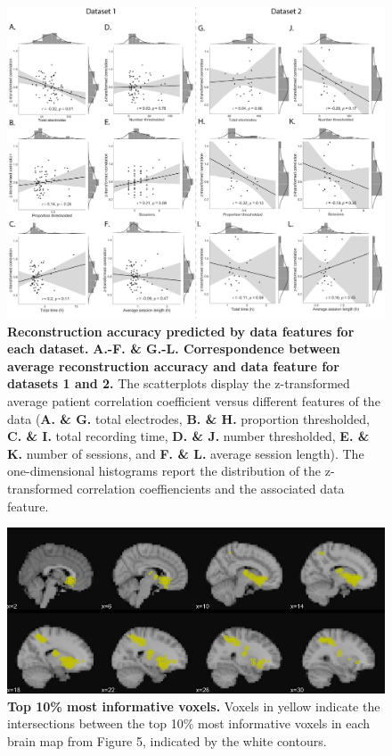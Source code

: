 \documentclass{article}
\begin{document}
\begin{figure}[ptb]
\centering
\includegraphics[width=\textwidth]{figs/supplemental_4}
\caption{\small \textbf{Reconstruction accuracy predicted by data
    features for each dataset.} \textbf{A.-F. \& G.-L.  Correspondence
    between average
    reconstruction accuracy
    and data feature for datasets 1 and 2.} The scatterplots display the z-transformed
  average patient correlation coefficient versus different features of
  the data (\textbf{A. \& G.} total electrodes, \textbf{B. \& H.}  proportion thresholded, \textbf{C. \& I.} total recording time,
  \textbf{D. \& J.}  number thresholded, \textbf{E. \& K.}  number of sessions, and \textbf{F. \& L.}  average session
  length). The one-dimensional histograms report the distribution of
  the z-transformed correlation coeffiencients and the associated data
feature.}
\label{fig:supplemental_4}
\end{figure}


\begin{figure}[ptb]
\centering
\includegraphics[width=\textwidth]{figs/supplemental_5}
\caption{\small \textbf{ Top 10\% most informative voxels.}
 Voxels in yellow indicate the intersections between
    the top 10\% most informative voxels in each brain map from Figure
    5, indicated by the white contours.}
\label{fig:supplemental_5}
\end{figure}


% 
\end{document}
